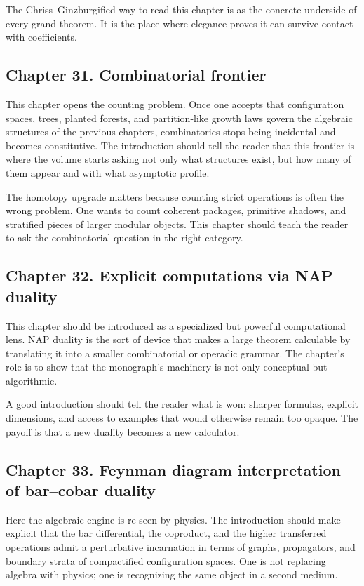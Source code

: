 The Chriss--Ginzburgified way to read this chapter is as the concrete underside of every grand theorem.  It is the place where elegance proves it can survive contact with coefficients.

\subsection*{Chapter 31. Combinatorial frontier}
This chapter opens the counting problem.  Once one accepts that configuration spaces, trees, planted forests, and partition-like growth laws govern the algebraic structures of the previous chapters, combinatorics stops being incidental and becomes constitutive.  The introduction should tell the reader that this frontier is where the volume starts asking not only what structures exist, but how many of them appear and with what asymptotic profile.

The homotopy upgrade matters because counting strict operations is often the wrong problem.  One wants to count coherent packages, primitive shadows, and stratified pieces of larger modular objects.  This chapter should teach the reader to ask the combinatorial question in the right category.

\subsection*{Chapter 32. Explicit computations via NAP duality}
This chapter should be introduced as a specialized but powerful computational lens.  NAP duality is the sort of device that makes a large theorem calculable by translating it into a smaller combinatorial or operadic grammar.  The chapter's role is to show that the monograph's machinery is not only conceptual but algorithmic.

A good introduction should tell the reader what is won: sharper formulas, explicit dimensions, and access to examples that would otherwise remain too opaque.  The payoff is that a new duality becomes a new calculator.

\subsection*{Chapter 33. Feynman diagram interpretation of bar--cobar duality}
Here the algebraic engine is re-seen by physics.  The introduction should make explicit that the bar differential, the coproduct, and the higher transferred operations admit a perturbative incarnation in terms of graphs, propagators, and boundary strata of compactified configuration spaces.  One is not replacing algebra with physics; one is recognizing the same object in a second medium.

